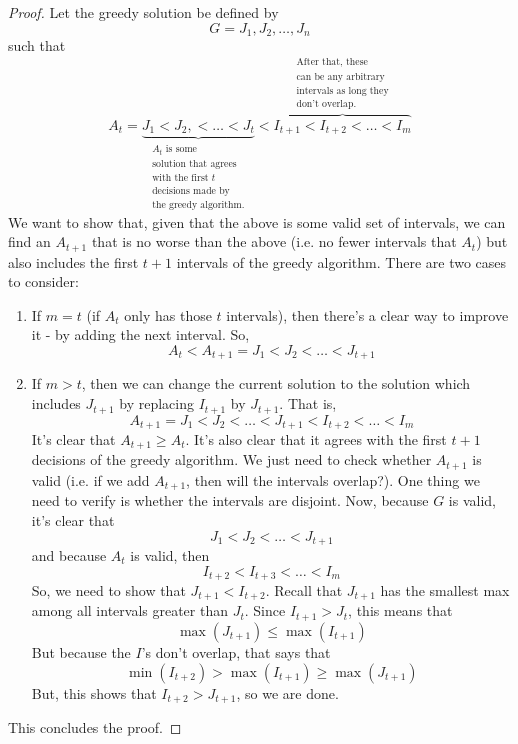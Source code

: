 \documentclass[letterpaper]{article}
\begin{document}
\begin{mdframed}[]
    \begin{proof}
        Let the greedy solution be defined by 
        \[G = J_1, J_2, \dots, J_n\]
        such that 
        \[A_t = \underbrace{J_1 < J_2, < \dots < J_t}_{\substack{A_t \text{ is some} \\ \text{solution that agrees} \\ \text {with the first } t \\ \text{decisions made by} \\ \text{the greedy algorithm.}}} < \overbrace{I_{t + 1} < I_{t + 2} < \dots < I_{m}}^{\substack{\text{After that, these} \\ \text{can be any arbitrary} \\ \text{intervals as long they} \\ \text{don't overlap.}}}\]
        We want to show that, given that the above is some valid set of intervals, we can find an $A_{t + 1}$ that is no worse than the above (i.e. no fewer intervals that $A_t$) but also includes the first $t + 1$ intervals of the greedy algorithm. There are two cases to consider:
        \begin{enumerate}
            \item If $m = t$ (if $A_t$ only has those $t$ intervals), then there's a clear way to improve it - by adding the next interval. So,
            \[A_t < A_{t + 1} = J_1 < J_2 < \dots < J_{t + 1}\]
            \item If $m > t$, then we can change the current solution to the solution which includes $J_{t + 1}$ by replacing $I_{t + 1}$ by $J_{t + 1}$. That is, 
            \[A_{t + 1} = J_1 < J_2 < \dots < J_{t + 1} < I_{t + 2} < \dots < I_m\]
            It's clear that $A_{t + 1} \geq A_t$. It's also clear that it agrees with the first $t + 1$ decisions of the greedy algorithm. We just need to check whether $A_{t + 1}$ is valid (i.e. if we add $A_{t + 1}$, then will the intervals overlap?). One thing we need to verify is whether the intervals are disjoint. Now, because $G$ is valid, it's clear that 
            \[J_1 < J_2 < \dots < J_{t + 1}\]
            and because $A_t$ is valid, then 
            \[I_{t + 2} < I_{t + 3} < \dots < I_{m}\]
            So, we need to show that $J_{t + 1} < I_{t + 2}$. Recall that $J_{t + 1}$ has the smallest max among all intervals greater than $J_t$. Since $I_{t + 1} > J_t$, this means that
            \[\max(J_{t + 1}) \leq \max(I_{t + 1})\]
            But because the $I$'s don't overlap, that says that 
            \[\min(I_{t + 2}) > \max(I_{t + 1}) \geq \max(J_{t + 1})\] 
            But, this shows that $I_{t + 2} > J_{t + 1}$, so we are done. 
        \end{enumerate}
        This concludes the proof. 
    \end{proof}
\end{mdframed}
\end{document}
